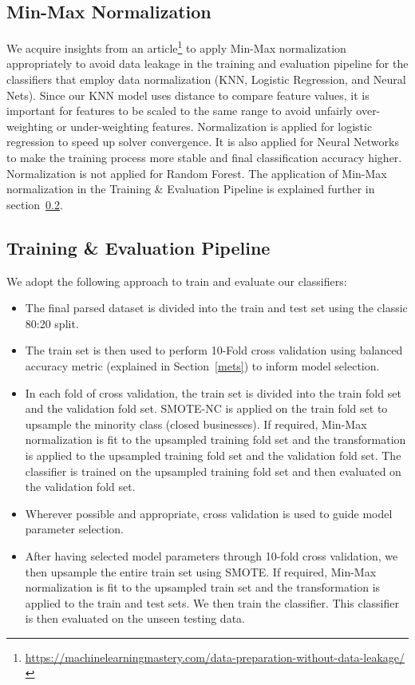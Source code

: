 \documentclass{article}
\begin{document}
\subsection{Min-Max Normalization}
We acquire insights from an article\footnote{\url{https://machinelearningmastery.com/data-preparation-without-data-leakage/}} to apply Min-Max normalization appropriately to avoid data leakage in the training and evaluation pipeline for the classifiers that employ data normalization (KNN, Logistic Regression, and Neural Nets). Since our KNN model uses distance to compare feature values, it is important for features to be scaled to the same range to avoid unfairly over-weighting or under-weighting features. Normalization is applied for logistic regression to speed up solver convergence. It is also applied for Neural Networks to make the training process more stable and final classification accuracy higher. Normalization is not applied for Random Forest.
The application of Min-Max normalization in the Training \& Evaluation Pipeline is explained further in section~\ref{TrainingPipeline}. 


\subsection{Training \& Evaluation Pipeline}
\label{TrainingPipeline}
We adopt the following approach to train and evaluate our classifiers:

\begin{itemize}[leftmargin=*]

\item The final parsed dataset is divided into the train and test set using the classic 80:20 split. 

\item The train set is then used to perform 10-Fold cross validation using balanced accuracy metric (explained in Section~\ref{mets}) to inform model selection.

\item In each fold of cross validation, the train set is divided into the train fold set and the validation fold set. SMOTE-NC is applied on the train fold set to upsample the minority class (closed businesses). If required, Min-Max normalization is fit to the upsampled training fold set and the transformation is applied to the upsampled training fold set and the validation fold set. The classifier is trained on the upsampled training fold set and then evaluated on the validation fold set. 

\item Wherever possible and appropriate, cross validation is used to guide model parameter selection.  


\item After having selected model parameters through 10-fold cross validation, we then upsample the entire train set using SMOTE. If required, Min-Max normalization is fit to the upsampled train set and the transformation is applied to the train and test sets. We then train the classifier. This classifier is then evaluated on the unseen testing data.

\end{itemize}
\end{document}
